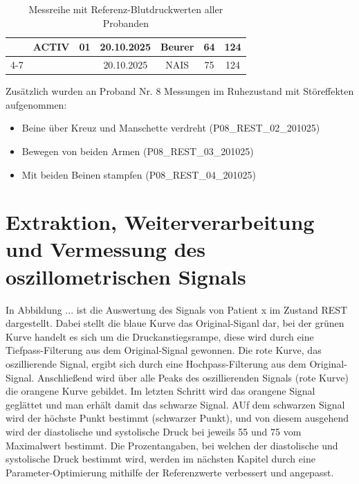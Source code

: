 \documentclass[a4paper, 11pt]{scrartcl}
\begin{document}
\begin{table}[htbp]
{\begin{tabular}{|c|c|c|c|c|c|c|}
& \multirow{2}{*}{ACTIV}
& \multirow{2}{*}{01} & 20.10.2025 & Beurer & 64 & 124 \\ \cline{4-7}
& & & 20.10.2025 & NAIS & 75 & 124 \\
\hline

\end{tabular}

}

\caption{Messreihe mit Referenz-Blutdruckwerten aller Probanden}
\label{tab:Messreihe_gesamt}

\end{table}

Zusätzlich wurden an Proband Nr. 8 Messungen im Ruhezustand mit Störeffekten aufgenommen:

\begin{itemize}
    \item Beine über Kreuz und Manschette verdreht (P08_REST_02_201025)
    \item Bewegen von beiden Armen (P08_REST_03_201025)
    \item Mit beiden Beinen stampfen (P08_REST_04_201025)
\end{itemize}



\newpage

\section*{Extraktion, Weiterverarbeitung und Vermessung des oszillometrischen Signals}

In Abbildung ... ist die Auswertung des Signals von Patient x im Zustand REST dargestellt.
Dabei stellt die blaue Kurve das Original-Siganl dar, bei der grünen Kurve handelt es sich um die Druckanstiegsrampe, diese wird durch eine Tiefpass-Filterung aus dem Original-Signal gewonnen. 
Die rote Kurve, das oszillierende Signal, ergibt sich durch eine Hochpass-Filterung aus dem Original-Signal. Anschließend wird über alle Peaks des oszillierenden Signals (rote Kurve) die orangene Kurve gebildet. 
Im letzten Schritt wird das orangene Signal geglättet und man erhält damit das schwarze Signal.
AUf dem schwarzen Signal wird der höchste Punkt bestimmt (schwarzer Punkt), und von diesem ausgehend wird der diastolische und systolische Druck bei jeweils 55 und 75 vom Maximalwert bestimmt. Die Prozentangaben, bei welchen der diastolische und systolische Druck bestimmt wird, werden im nächsten Kapitel durch eine Parameter-Optimierung mithilfe der Referenzwerte verbessert und angepasst.
\end{document}
